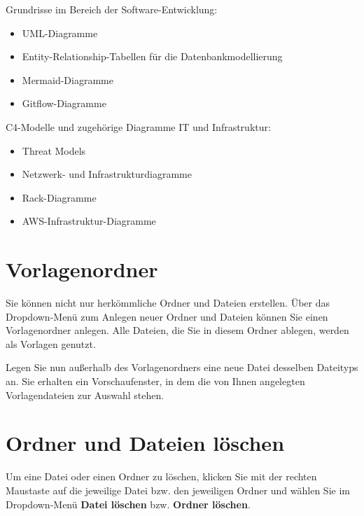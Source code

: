 \documentclass[
  letterpaper,
  DIV=11,
  numbers=noendperiod]{scrreprt}
\providecommand{\tightlist}{%
  \setlength{\itemsep}{0pt}\setlength{\parskip}{0pt}}\usepackage{longtable,booktabs,array}
\begin{document}
Grundrisse im Bereich der Software-Entwicklung:

\begin{itemize}
\tightlist
\item
  UML-Diagramme
\item
  Entity-Relationship-Tabellen für die Datenbankmodellierung
\item
  Mermaid-Diagramme
\item
  Gitflow-Diagramme
\end{itemize}

C4-Modelle und zugehörige Diagramme IT und Infrastruktur:

\begin{itemize}
\tightlist
\item
  Threat Models
\item
  Netzwerk- und Infrastrukturdiagramme
\item
  Rack-Diagramme
\item
  AWS-Infrastruktur-Diagramme
\end{itemize}

\section{Vorlagenordner}\label{vorlagenordner}

Sie können nicht nur herkömmliche Ordner und Dateien erstellen. Über das
Dropdown-Menü zum Anlegen neuer Ordner und Dateien können Sie einen
Vorlagenordner anlegen. Alle Dateien, die Sie in diesem Ordner ablegen,
werden als Vorlagen genutzt.

Legen Sie nun außerhalb des Vorlagenordners eine neue Datei desselben
Dateityps an. Sie erhalten ein Vorschaufenster, in dem die von Ihnen
angelegten Vorlagendateien zur Auswahl stehen.

\section{Ordner und Dateien
löschen}\label{ordner-und-dateien-luxf6schen}

Um eine Datei oder einen Ordner zu löschen, klicken Sie mit der rechten
Maustaste auf die jeweilige Datei bzw. den jeweiligen Ordner und wählen
Sie im Dropdown-Menü \textbf{Datei löschen} bzw. \textbf{Ordner
löschen}.
\end{document}
